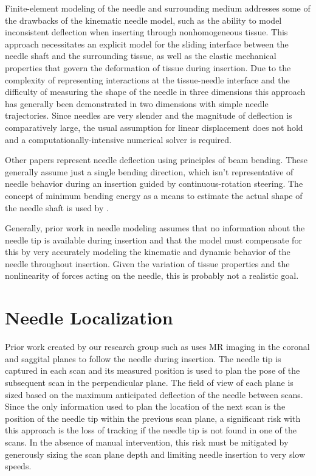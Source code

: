 Finite-element modeling of the needle and surrounding medium addresses some of the drawbacks of the kinematic needle model, such as the ability to model inconsistent deflection when inserting through nonhomogeneous tissue. This approach necessitates an explicit model for the sliding interface between the needle shaft and the surrounding tissue, as well as the elastic mechanical properties that govern the deformation of tissue during insertion. Due to the complexity of representing interactions at the tissue-needle interface and the difficulty of measuring the shape of the needle in three dimensions this approach has generally been demonstrated in two dimensions with simple needle trajectories. Since needles are very slender and the magnitude of deflection is comparatively large, the usual assumption for linear displacement does not hold and a computationally-intensive numerical solver is required.

Other papers represent needle deflection using principles of beam bending. These generally assume just a single bending direction, which isn't representative of needle behavior during an insertion guided by continuous-rotation steering. The concept of minimum bending energy as a means to estimate the actual shape of the needle shaft is used by \cite{roesthuis_modeling_2015}.

Generally, prior work in needle modeling assumes that no information about the needle tip is available during insertion and that the model must compensate for this by very accurately modeling the kinematic and dynamic behavior of the needle throughout insertion. Given the variation of tissue properties and the nonlinearity of forces acting on the needle, this is probably not a realistic goal.

\section{Needle Localization}
Prior work created by our research group such as \cite{patel_closed-loop_2015} uses MR imaging in the coronal and saggital planes to follow the needle during insertion. The needle tip is captured in each scan and its measured position is used to plan the pose of the subsequent scan in the perpendicular plane. The field of view of each plane is sized based on the maximum anticipated deflection of the needle between scans. Since the only information used to plan the location of the next scan is the position of the needle tip within the previous scan plane, a significant risk with this approach is the loss of tracking if the needle tip is not found in one of the scans. In the absence of manual intervention, this risk must be mitigated by generously sizing the scan plane depth and limiting needle insertion to very slow speeds.

